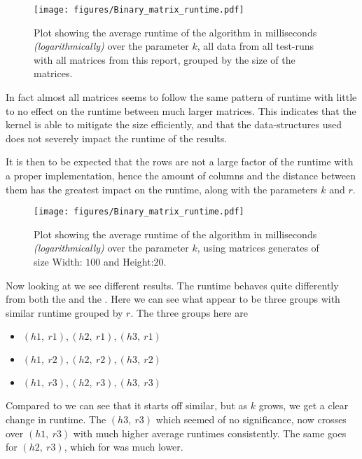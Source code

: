 \documentclass[a4paper]{article}
\begin{document}
\begin{figure}[!ht]
    \centering
    \texttt{[image: figures/Binary\_matrix\_runtime.pdf]}
    \caption{Plot showing the average runtime of the algorithm in milliseconds \textit{(logarithmically)}
        over the parameter $k$, all data from all test-runs with all matrices from this report, grouped by
        the size of the matrices.}
    \label{fig:res-all-matrices-over-k}
\end{figure}

In fact almost all matrices seems to follow the same pattern of runtime with little to no effect on the runtime
between much larger matrices. This indicates that the kernel is able to mitigate the size efficiently, and that
the data-structures used does not severely impact the runtime of the results.

It is then to be expected that the rows are not a large factor of the runtime with a proper implementation,
hence the amount of columns and the distance between them has the greatest impact on the runtime, along
with the parameters $k$ and $r$.

\begin{figure}[H]
    \centering
    \texttt{[image: figures/Binary\_matrix\_runtime.pdf]}
    \caption{Plot showing the average runtime of the algorithm in milliseconds \textit{(logarithmically)}
        over the parameter $k$, using matrices generates of size Width: $100$ and Height:$20$.}
    \label{fig:res-100x20k}
\end{figure}

Now looking at  we see different results. The runtime behaves quite differently from
both the  and the . Here we can see what appear to be
three groups with similar runtime grouped by $r$. The three groups here are
\begin{itemize}
    \item $(h1,~r1),(h2,~r1),(h3,~r1)$
    \item $(h1,~r2),(h2,~r2),(h3,~r2)$
    \item $(h1,~r3),(h2,~r3),(h3,~r3)$
\end{itemize}

Compared to  we can see that it starts off similar, but as $k$ grows, we get a
clear change in runtime. The $(h3,~r3)$ which seemed of no significance, now crosses over $(h1,~r3)$
with much higher average runtimes consistently. The same goes for $(h2,~r3)$, which for 
was much lower.
\end{document}

